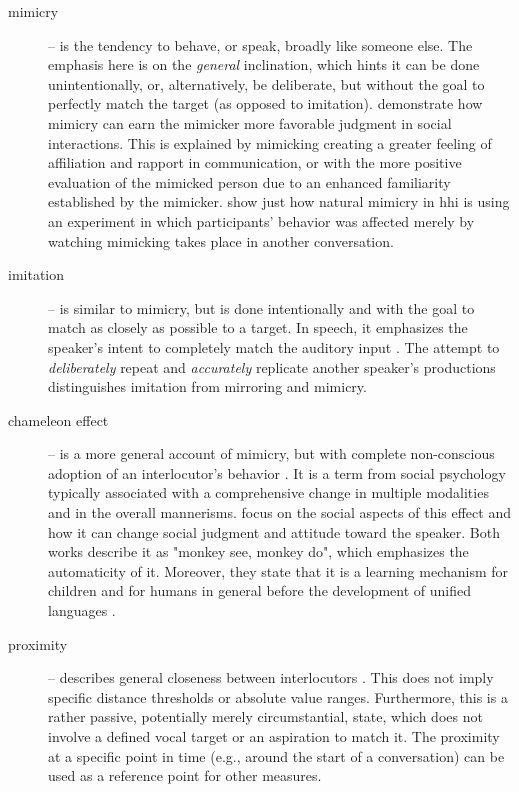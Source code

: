 \begin{description}
	\item[mimicry] -- is the tendency to behave, or speak, broadly like someone else.
	The emphasis here is on the \emph{general} inclination, which hints it can be done unintentionally, or, alternatively, be deliberate, but without the goal to perfectly match the target (as opposed to imitation).
	\citet{Gueguen2009mimicry} demonstrate how mimicry can earn the mimicker more favorable judgment in social interactions.
	This is explained by mimicking creating a greater feeling of affiliation and rapport in communication, or with the more positive evaluation of the mimicked person due to an enhanced familiarity established by the mimicker.
	\citet{Parrill2006seeing} show just how natural mimicry in \ac{hhi} is using an experiment in which participants' behavior was affected merely by watching mimicking takes place in another conversation.
	
	\item[imitation] -- is similar to mimicry, but is done intentionally and with the goal to match as closely as possible to a target.
	In speech, it emphasizes the speaker's intent to completely match the auditory input \citep[cf.][]{Gueguen2009mimicry}.
	The attempt to \emph{deliberately} repeat and \emph{accurately} replicate another speaker's productions distinguishes imitation from mirroring and mimicry.
	
	\item[chameleon effect] -- is a more general account of mimicry, but with complete non-conscious adoption of an interlocutor's behavior \citep{Chartrand1999chameleon}.
	It is a term from social psychology typically associated with a comprehensive change in multiple modalities and in the overall mannerisms.
	\citet{Gueguen2009mimicry} focus on the social aspects of this effect and how it can change social judgment and attitude toward the speaker.
	Both works describe it as "monkey see, monkey do", which emphasizes the automaticity of it.
	Moreover, they state that it is a learning mechanism for children and for humans in general before the development of unified languages \citep[][p.~256]{Gueguen2009mimicry}.
	
	\item[proximity] -- describes general closeness between interlocutors \citep[as illustrated in Figure 1 in][]{Levitan2011measuring}.
	This does not imply specific distance thresholds or absolute value ranges.
	Furthermore, this is a rather passive, potentially merely circumstantial, state, which does not involve a defined vocal target or an aspiration to match it.
	The proximity at a specific point in time (e.g., around the start of a conversation) can be used as a reference point for other measures.
	

\end{description}

